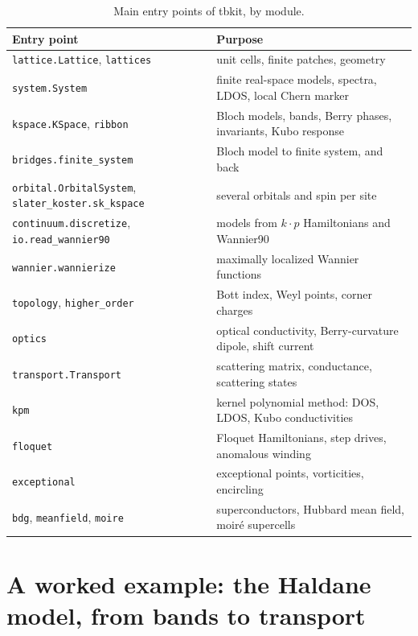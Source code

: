 \documentclass[submission, Phys]{SciPost}
\newcommand{\code}[1]{\texttt{#1}}
\begin{document}
\begin{table}[htb]
\centering\small
\caption{Main entry points of tbkit, by module.}
\label{tab:entry}
\begin{tabularx}{\textwidth}{>{\raggedright\arraybackslash}p{4.6cm}X}
\toprule
Entry point & Purpose \\
\midrule
\code{lattice.Lattice}, \code{lattices} & unit cells, finite patches, geometry \\
\code{system.System} & finite real-space models, spectra, LDOS, local Chern marker \\
\code{kspace.KSpace}, \code{ribbon} & Bloch models, bands, Berry phases, invariants, Kubo response \\
\code{bridges.finite\_system} & Bloch model to finite system, and back \\
\code{orbital.OrbitalSystem}, \code{slater\_koster.sk\_kspace} & several orbitals and spin per site \\
\code{continuum.discretize}, \code{io.read\_wannier90} & models from $k\cdot p$ Hamiltonians and Wannier90 \\
\code{wannier.wannierize} & maximally localized Wannier functions \\
\code{topology}, \code{higher\_order} & Bott index, Weyl points, corner charges \\
\code{optics} & optical conductivity, Berry-curvature dipole, shift current \\
\code{transport.Transport} & scattering matrix, conductance, scattering states \\
\code{kpm} & kernel polynomial method: DOS, LDOS, Kubo conductivities \\
\code{floquet} & Floquet Hamiltonians, step drives, anomalous winding \\
\code{exceptional} & exceptional points, vorticities, encircling \\
\code{bdg}, \code{meanfield}, \code{moire} & superconductors, Hubbard mean field, moir\'e supercells \\
\bottomrule
\end{tabularx}
\end{table}

\section{A worked example: the Haldane model, from bands to transport}
\label{sec:example}
\end{document}
